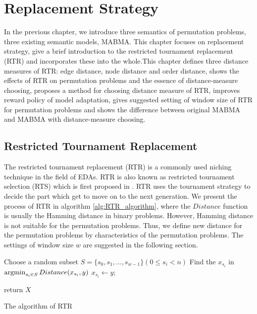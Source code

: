 \section{Replacement Strategy}
\label{ch:replacement_strategy}

In the previous chapter, we introduce three semantics of permutation problems, three existing semantic models, MABMA. This chapter focuses on replacement strategy, give a brief introduction to the restricted tournament replacement (RTR) and incorporates these into the whole.This chapter defines three distance measures of RTR: edge distance, node distance and order distance, shows the effects of RTR on permutation problems and the essence of distance-measure choosing, proposes a method for choosing distance measure of RTR, improves reward policy of model adaptation, gives suggested setting of window size of RTR for permutation problems and shows the difference between original MABMA and MABMA with distance-measure choosing.




\subsection{Restricted Tournament Replacement}
The restricted tournament replacement (RTR) is a commonly used niching technique in the field of EDAs. RTR is also known as restricted tournament selection (RTS) which is first proposed in \citep{harik1995rts}. RTR uses the tournament strategy to decide the part which get to move on to the next generation. We present the process of RTR in algorithm \ref{alg:RTR_algorithm}, where the $Distance$ function is usually the Hamming distance in binary problems. However, Hamming distance is not suitable for the permutation problems. Thus, we define new distance for the permutation problems by characteristics of the permutation problems. The settings of window size $w$ are suggested in the following section.


\begin{algorithm}[htbp]
    {
        Choose a random subset $S =\lbrace s_0, s_1, ..., s_{w-1}\rbrace (0\leq s_i <n)$\;
        Find the $x_{s_i}$ in $\mathop{\argmin}_{{s_i} \in S} Distance(x_{s_i},y)$\;
              {
        $x_{s_i} \leftarrow y$;
        }
        
    }
    return $X$\;
    \caption{The algorithm of RTR}
    \label{alg:RTR_algorithm}
\end{algorithm}


